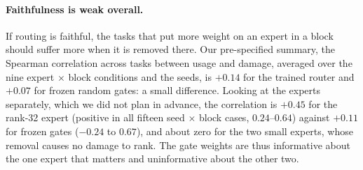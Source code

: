 \documentclass[11pt]{article}
\begin{document}
\paragraph{Faithfulness is weak overall.} If routing is faithful, the tasks that put more weight
on an expert in a block should suffer more when it is removed there. Our pre-specified summary,
the Spearman correlation across tasks between usage and damage, averaged over the nine expert
$\times$ block conditions and the seeds, is $+0.14$ for the trained router and $+0.07$ for
frozen random gates: a small difference. Looking at the experts separately, which we did not
plan in advance, the correlation is $+0.45$ for the rank-32 expert (positive in all fifteen seed
$\times$ block cases, $0.24$--$0.64$) against $+0.11$ for frozen gates ($-0.24$ to $0.67$), and
about zero for the two small experts, whose removal causes no damage to rank. The gate weights
are thus informative about the one expert that matters and uninformative about the other two.
\end{document}

